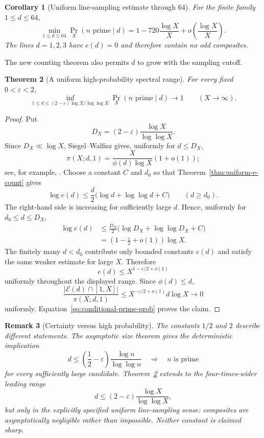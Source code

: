 \documentclass[11pt]{article}
\newtheorem{theorem}{Theorem}[section]
\newtheorem{corollary}[theorem]{Corollary}
\newtheorem{remark}[theorem]{Remark}
\newcommand{\Eset}{\mathcal E}
\begin{document}
\begin{corollary}[Uniform line-sampling estimate through $64$]
\label{cor:probability64}
For the finite family $1\le d\le64$,
\[
\min_{1\le d\le64}\Pr_X(n\text{ prime}\mid d)
=
1-720\frac{\log X}{X}
+o\!\left(\frac{\log X}{X}\right).
\]
The lines $d=1,2,3$ have $e(d)=0$ and therefore contain no odd composites.
\end{corollary}

The new counting theorem also permits $d$ to grow with the sampling cutoff.

\begin{theorem}[A uniform high-probability spectral range]
\label{thm:uniform-probability-growing-d}
For every fixed $0<\varepsilon<2$,
\begin{equation}
\boxed{
\inf_{1\le d\le(2-\varepsilon)\log X/\log\log X}
\Pr_X(n\text{ prime}\mid d)
\longrightarrow1
\qquad(X\to\infty).
}
\label{eq:uniform-probability-growing-d}
\end{equation}
\end{theorem}

\begin{proof}
Put
\[
D_X=(2-\varepsilon)\frac{\log X}{\log\log X}.
\]
Since $D_X\ll\log X$, Siegel--Walfisz gives, uniformly for $d\le D_X$,
\[
\pi(X;d,1)=\frac{X}{\phi(d)\log X}(1+o(1));
\]
see, for example, \cite[Chapter~5]{IwaniecKowalski2004}.  Choose a constant
$C$ and $d_0$ so that Theorem~\ref{thm:uniform-e-count} gives
\[
\log e(d)\le\frac d2\bigl(\log d+\log\log d+C\bigr)
\qquad(d\ge d_0).
\]
The right-hand side is increasing for sufficiently large $d$.  Hence, uniformly
for $d_0\le d\le D_X$,
\begin{align*}
\log e(d)
&\le \frac{D_X}{2}
   \bigl(\log D_X+\log\log D_X+C\bigr)\\
&=\left(1-\frac\varepsilon2+o(1)\right)\log X.
\end{align*}
The finitely many $d<d_0$ contribute only bounded constants $e(d)$ and satisfy
the same weaker estimate for large $X$.  Therefore
\[
e(d)\le X^{1-\varepsilon/2+o(1)}
\]
uniformly throughout the displayed range.  Since $\phi(d)\le d$,
\[
\frac{|\Eset(d)\cap[1,X]|}{\pi(X;d,1)}
\le X^{-\varepsilon/2+o(1)}d\log X\longrightarrow0
\]
uniformly.  Equation~\eqref{eq:conditional-prime-prob} proves the claim.
\end{proof}

\begin{remark}[Certainty versus high probability]
The constants $1/2$ and $2$ describe different statements.  The asymptotic
size theorem gives the deterministic implication
\[
d\le\left(\frac12-\varepsilon\right)
\frac{\log n}{\log\log n}
\quad\Longrightarrow\quad n\text{ is prime}
\]
for every sufficiently large candidate.  Theorem~\ref{thm:uniform-probability-growing-d}
extends to the four-times-wider leading range
\[
d\le(2-\varepsilon)\frac{\log X}{\log\log X},
\]
but only in the explicitly specified uniform line-sampling sense: composites
are asymptotically negligible rather than impossible.  Neither constant is
claimed sharp.
\end{remark}
\end{document}

